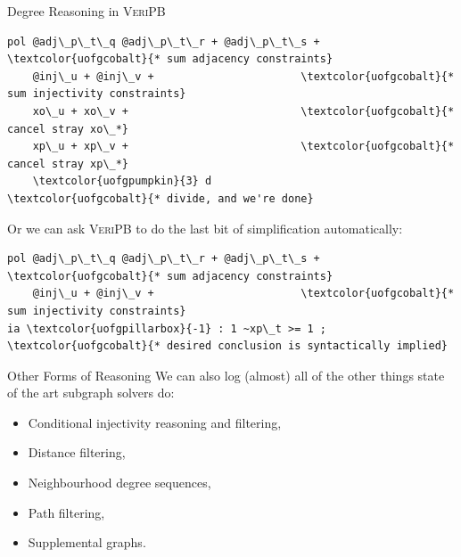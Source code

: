\documentclass[aspectratio=169,compress,10pt]{beamer}
\makeatletter
\newcommand{\proofsystemformat}[1]{\textsc{#1}\@}
\newcommand{\veripb}{\proofsystemformat{VeriPB}\xspace}
\makeatother
\begin{document}
\begin{frame}[fragile]{Degree Reasoning in \veripb}
\begin{Verbatim}[commandchars=\\\{\},codes={\catcode`$=3\catcode`^=7\catcode`_=8}]
pol @adj\_p\_t\_q @adj\_p\_t\_r + @adj\_p\_t\_s +    \textcolor{uofgcobalt}{* sum adjacency constraints}
    @inj\_u + @inj\_v +                       \textcolor{uofgcobalt}{* sum injectivity constraints}
    xo\_u + xo\_v +                           \textcolor{uofgcobalt}{* cancel stray xo\_*}
    xp\_u + xp\_v +                           \textcolor{uofgcobalt}{* cancel stray xp\_*}
    \textcolor{uofgpumpkin}{3} d                                     \textcolor{uofgcobalt}{* divide, and we're done}
\end{Verbatim}

\medskip

Or we can ask \veripb to do the last bit of simplification automatically:

\medskip

\begin{Verbatim}[commandchars=\\\{\},codes={\catcode`$=3\catcode`^=7\catcode`_=8}]
pol @adj\_p\_t\_q @adj\_p\_t\_r + @adj\_p\_t\_s +    \textcolor{uofgcobalt}{* sum adjacency constraints}
    @inj\_u + @inj\_v +                       \textcolor{uofgcobalt}{* sum injectivity constraints}
ia \textcolor{uofgpillarbox}{-1} : 1 ~xp\_t >= 1 ;                      \textcolor{uofgcobalt}{* desired conclusion is syntactically implied}
\end{Verbatim}
\end{frame}

\begin{frame}{Other Forms of Reasoning}
    We can also log (almost) all of the other things state of the art subgraph solvers do:
\begin{itemize}
\item
  Conditional injectivity reasoning and filtering,
\item
  Distance filtering,
\item
  Neighbourhood degree sequences,
\item
  Path filtering,
\item
  Supplemental graphs.
\end{itemize}

\medskip

\end{frame}
\end{document}
